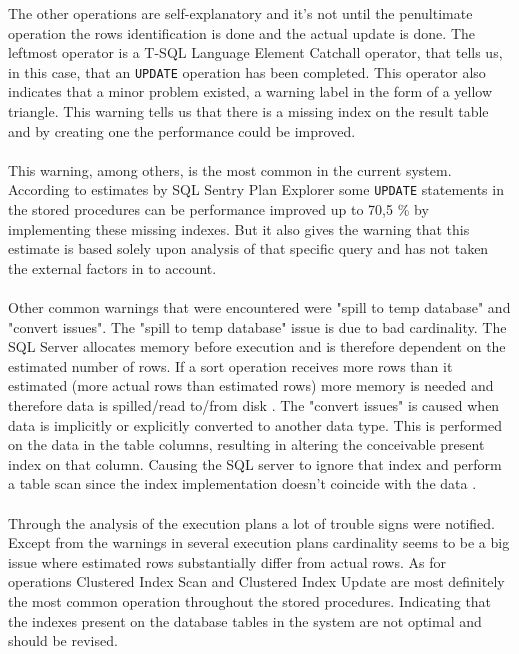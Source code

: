 \documentclass{cslthse-msc}
\begin{document}
The other operations are self-explanatory and it's not until the penultimate operation the rows identification is done and the actual update is done. The leftmost operator is a T-SQL Language Element Catchall operator, that tells us, in this case, that an \texttt{UPDATE} operation has been completed. This operator also indicates that a minor problem existed, a warning label in the form of a yellow triangle. This warning tells us that there is a missing index on the result table and by creating one the performance could be improved.\\\\
This warning, among others, is the most common in the current system. According to estimates by SQL Sentry Plan Explorer some \texttt{UPDATE} statements in the stored procedures can be performance improved up to 70,5 \% by implementing these missing indexes. But it also gives the warning that this estimate is based solely upon analysis of that specific query and has not taken the external factors in to account.\\\\ 
Other common warnings that were encountered were "spill to temp database" and "convert issues". The "spill to temp database" issue is due to bad cardinality. The SQL Server allocates memory before execution and is therefore dependent on the estimated number of rows. If a sort operation receives more rows than it estimated (more actual rows than estimated rows) more memory is needed and therefore data is spilled/read to/from disk \cite{sortissues}. The "convert issues" is caused when data is implicitly or explicitly converted to another data type. This is performed on the data in the table columns, resulting in  altering the conceivable present index on that column. Causing the SQL server to ignore that index and perform a table scan since the index implementation doesn't coincide with the data \cite{convertissues}.\\\\
Through the analysis of the execution plans a lot of trouble signs were notified. Except from the warnings in several execution plans cardinality seems to be a big issue where estimated rows substantially differ from actual rows. As for operations Clustered Index Scan and Clustered Index Update are most definitely the most common operation throughout the stored procedures. Indicating that the indexes present on the database tables in the system are not optimal and should be revised.    

\newpage
\end{document}
